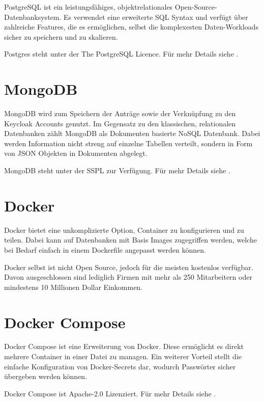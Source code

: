 PostgreSQL ist ein leistungsfähiges, objektrelationales Open-Source-Datenbanksystem.
Es verwendet eine erweiterte \ac{SQL} Syntax und verfügt über zahlreiche Features,
die es ermöglichen, selbst die komplexesten Daten-Workloads sicher zu speichern und zu skalieren.
\cite{about-postgres}

Postgres steht unter der The PostgreSQL Licence.
Für mehr Details siehe .


\section{MongoDB}\label{sec:mongodb}

MongoDB wird zum Speichern der Anträge sowie der Verknüpfung zu den Keycloak Accounts genutzt.
Im Gegensatz zu den klassischen, relationalen Datenbanken zählt MongoDB als Dokumenten basierte NoSQL Datenbank.
Dabei werden Information nicht streng auf einzelne Tabellen verteilt, sondern in Form von \ac{JSON} Objekten in Dokumenten abgelegt.

MongoDB steht unter der \acl{SSPL} zur Verfügung.
Für mehr Details siehe .

\section{Docker}\label{sec:docker}

Docker bietet eine unkomplizierte Option, Container zu konfigurieren und zu teilen.
Dabei kann auf Datenbanken mit Basis Images zugegriffen werden, welche bei Bedarf
einfach in einem Dockerfile angepasst werden können.

Docker selbst ist nicht Open Source, jedoch für die meisten kostenlos verfügbar.
Davon ausgeschlossen sind lediglich Firmen mit mehr als 250 Mitarbeitern oder mindestens 10 Millionen Dollar Einkommen.

\section{Docker Compose}\label{sec:docker-compose}

Docker Compose ist eine Erweiterung von Docker.
Diese ermöglicht es direkt mehrere Container in einer Datei zu managen.
Ein weiterer Vorteil stellt die einfache Konfiguration von Docker-Secrets dar, wodurch \ua Passwörter sicher übergeben werden können.

Docker Compose ist Apache-2.0 Lizenziert.
Für mehr Details siehe .

